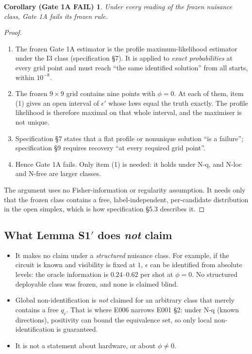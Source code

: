 \documentclass[11pt,a4paper]{article}
\theoremstyle{plain}
\newtheorem*{corollary}{Corollary (Gate 1A FAIL)}
\theoremstyle{definition}
\theoremstyle{remark}
\newcommand{\eps}{\epsilon}
\begin{document}
\begin{corollary}
Under every reading of the frozen nuisance class, Gate 1A fails its frozen rule.
\end{corollary}
\begin{proof}
\begin{enumerate}[label=\textbf{Step \arabic*.},leftmargin=*,itemsep=2pt]
\item The frozen Gate 1A estimator is the profile maximum-likelihood estimator under the I3 class
(specification \S7). It is applied to \emph{exact probabilities} at every grid point and must reach
``the same identified solution'' from all starts, within $10^{-8}$.
\item The frozen $9\times9$ grid contains nine points with $\phi=0$. At each of them, item (1)
gives an open interval of $\eps'$ whose laws equal the truth exactly. The profile likelihood is
therefore maximal on that whole interval, and the maximiser is not unique.
\item Specification \S7 states that a flat profile or nonunique solution ``is a failure'';
specification \S9 requires recovery ``at every required grid point''.
\item Hence Gate 1A fails. Only item (1) is needed: it holds under N-q, and N-loc and N-free
are larger classes.
\end{enumerate}
The argument uses no Fisher-information or regularity assumption. It needs only that the
frozen class contains a free, label-independent, per-candidate distribution in the open simplex,
which is how specification \S5.3 describes it.
\end{proof}

\subsection{\texorpdfstring{What Lemma S1$'$ does \emph{not} claim}{What Lemma S1' does not claim}}
\begin{itemize}[leftmargin=*,itemsep=2pt]
\item It makes no claim under a \emph{structured} nuisance class. For example, if the circuit is
known and visibility is fixed at $1$, $\eps$ can be identified from absolute levels: the oracle
information is $0.24$--$0.62$ per shot at $\phi=0$. No structured deployable class was frozen,
and none is claimed blind.
\item Global non-identification is \emph{not} claimed for an arbitrary class that merely contains
a free $q_c$. That is where E006 narrows E001 \S2: under N-q (known directions), positivity can
bound the equivalence set, so only local non-identification is guaranteed.
\item It is not a statement about hardware, or about $\phi\neq0$.
\end{itemize}
\end{document}
